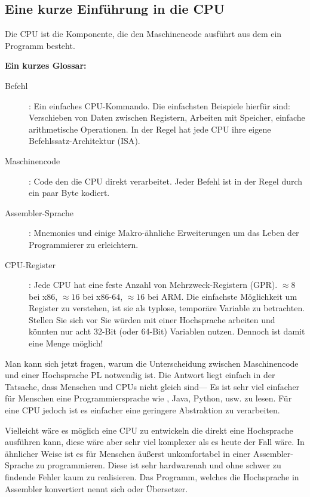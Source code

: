 \subsection{Eine kurze Einführung in die CPU}

Die \ac{CPU} ist die Komponente, die den Maschinencode ausführt aus dem ein Programm besteht.

\textbf{Ein kurzes Glossar:}

\begin{description}
\item[Befehl]: Ein einfaches \ac{CPU}-Kommando.
Die einfachsten Beispiele hierfür sind: Verschieben von Daten zwischen Registern, Arbeiten mit Speicher,
einfache arithmetische Operationen.
In der Regel hat jede \ac{CPU} ihre eigene Befehlssatz-Architektur (\ac{ISA}).

\item[Maschinencode]: Code den die \ac{CPU} direkt verarbeitet. 
Jeder Befehl ist in der Regel durch ein paar Byte kodiert.
\item[Assembler-Sprache]: Mnemonics und einige Makro-ähnliche Erweiterungen um das Leben der Programmierer zu erleichtern.
\item[CPU-Register]: Jede \ac{CPU} hat eine feste Anzahl von Mehrzweck-Registern (\ac{GPR}).
$\approx 8$ bei x86, $\approx 16$ bei x86-64, $\approx 16$ bei ARM.
Die einfachste Möglichkeit um Register zu verstehen, ist sie als typlose, temporäre Variable zu betrachten.
Stellen Sie sich vor Sie würden mit einer Hochsprache arbeiten und könnten nur acht 32-Bit (oder 64-Bit) Variablen
nutzen. Dennoch ist damit eine Menge möglich!
\end{description}


Man kann sich jetzt fragen, warum die Unterscheidung zwischen Maschinencode und einer Hochsprache \ac{PL} notwendig ist.
Die Antwort liegt einfach in der Tatsache, dass Menschen und \ac{CPU}s nicht gleich sind---%
Es ist sehr viel einfacher für Menschen eine Programmiersprache wie \CCpp, Java, Python, usw. zu lesen. Für eine \ac{CPU} jedoch
ist es einfacher eine geringere Abstraktion zu verarbeiten.

Vielleicht wäre es möglich eine \ac{CPU} zu entwickeln die direkt eine Hochsprache ausführen kann,
diese wäre aber sehr viel komplexer als es heute der Fall wäre.
In ähnlicher Weise ist es für Menschen äußerst unkomfortabel in einer Assembler-Sprache zu programmieren.
Diese ist sehr hardwarenah und ohne schwer zu findende Fehler kaum zu realisieren. %
Das Programm, welches die Hochsprache in Assembler konvertiert nennt sich  oder Übersetzer.

